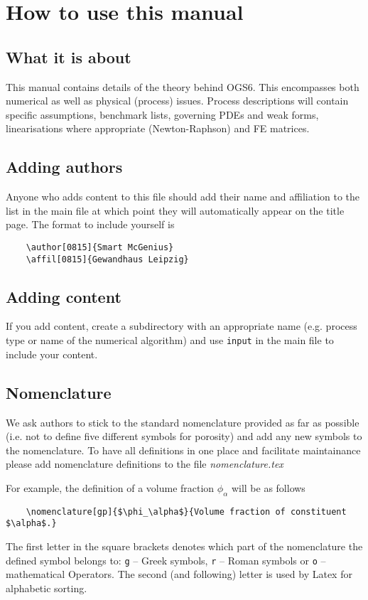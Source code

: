 \chapter{How to use this manual}

\section{What it is about}
This manual contains details of the theory behind OGS6. This encompasses both numerical as well as physical (process) issues. Process descriptions will contain specific assumptions, benchmark lists, governing PDEs and weak forms, linearisations where appropriate (Newton-Raphson) and FE matrices.

\section{Adding authors}
Anyone who adds content to this file should add their name and affiliation to the list in the main file at which point they will automatically appear on the title page. The format to include yourself is 
\begin{verbatim}
	\author[0815]{Smart McGenius}
	\affil[0815]{Gewandhaus Leipzig}
\end{verbatim}

\section{Adding content}
If you add content, create a subdirectory with an appropriate name (e.g. process type or name of the numerical algorithm) and use \texttt{input} in the main file to include your content.

\section{Nomenclature}
We ask authors to stick to the standard nomenclature provided as far as possible (i.e. not to define five different symbols for porosity) and add any new symbols to the nomenclature. To have all definitions in one place and facilitate maintainance please add nomenclature definitions to the file \textit{nomenclature.tex}

For example, the definition of a volume fraction $\phi_\alpha$ will be as follows
\begin{verbatim}
	\nomenclature[gp]{$\phi_\alpha$}{Volume fraction of constituent $\alpha$.}
\end{verbatim}
The first letter in the square brackets denotes which part of the nomenclature the defined symbol belongs to: \texttt{g} -- Greek symbols, \texttt{r} -- Roman symbols or \texttt{o} -- mathematical Operators. The second (and following) letter is used by Latex for alphabetic sorting.

